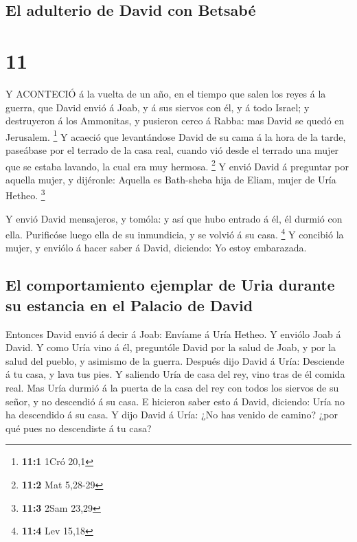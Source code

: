 \hypertarget{el-adulterio-de-david-con-betsabuxe9}{%
\subsection{El adulterio de David con
Betsabé}\label{el-adulterio-de-david-con-betsabuxe9}}

\hypertarget{section-10}{%
\section{11}\label{section-10}}

 Y ACONTECIÓ á la vuelta de un año, en el tiempo que salen
los reyes á la guerra, que David envió á Joab, y á sus siervos con él, y
á todo Israel; y destruyeron á los Ammonitas, y pusieron cerco á Rabba:
mas David se quedó en Jerusalem. \footnote{\textbf{11:1} 1Cró 20,1}
 Y acaeció que levantándose David de su cama á la hora de la
tarde, paseábase por el terrado de la casa real, cuando vió desde el
terrado una mujer que se estaba lavando, la cual era muy hermosa.
\footnote{\textbf{11:2} Mat 5,28-29}  Y envió David á
preguntar por aquella mujer, y dijéronle: Aquella es Bath-sheba hija de
Eliam, mujer de Uría Hetheo. \footnote{\textbf{11:3} 2Sam 23,29}

 Y envió David mensajeros, y tomóla: y así que hubo entrado
á él, él durmió con ella. Purificóse luego ella de su inmundicia, y se
volvió á su casa. \footnote{\textbf{11:4} Lev 15,18}  Y
concibió la mujer, y enviólo á hacer saber á David, diciendo: Yo estoy
embarazada.

\hypertarget{el-comportamiento-ejemplar-de-uria-durante-su-estancia-en-el-palacio-de-david}{%
\subsection{El comportamiento ejemplar de Uria durante su estancia en el
Palacio de
David}\label{el-comportamiento-ejemplar-de-uria-durante-su-estancia-en-el-palacio-de-david}}

 Entonces David envió á decir á Joab: Envíame á Uría Hetheo.
Y enviólo Joab á David.  Y como Uría vino á él, preguntóle
David por la salud de Joab, y por la salud del pueblo, y asimismo de la
guerra.  Después dijo David á Uría: Desciende á tu casa, y
lava tus pies. Y saliendo Uría de casa del rey, vino tras de él comida
real.  Mas Uría durmió á la puerta de la casa del rey con
todos los siervos de su señor, y no descendió á su casa.  E
hicieron saber esto á David, diciendo: Uría no ha descendido á su casa.
Y dijo David á Uría: ¿No has venido de camino? ¿por qué pues no
descendiste á tu casa?

